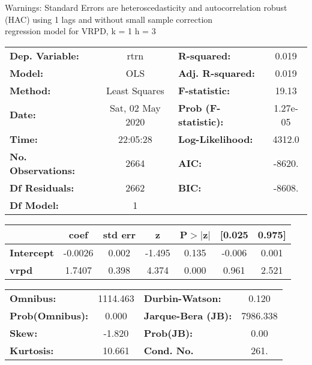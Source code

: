 Warnings: \newline
 [1] Standard Errors are heteroscedasticity and autocorrelation robust (HAC) using 1 lags and without small sample correction\\ 

regression model for VRPD, k = 1 h = 3\begin{center}
\begin{tabular}{lclc}
\toprule
\textbf{Dep. Variable:}    &       rtrn       & \textbf{  R-squared:         } &     0.019   \\
\textbf{Model:}            &       OLS        & \textbf{  Adj. R-squared:    } &     0.019   \\
\textbf{Method:}           &  Least Squares   & \textbf{  F-statistic:       } &     19.13   \\
\textbf{Date:}             & Sat, 02 May 2020 & \textbf{  Prob (F-statistic):} &  1.27e-05   \\
\textbf{Time:}             &     22:05:28     & \textbf{  Log-Likelihood:    } &    4312.0   \\
\textbf{No. Observations:} &        2664      & \textbf{  AIC:               } &    -8620.   \\
\textbf{Df Residuals:}     &        2662      & \textbf{  BIC:               } &    -8608.   \\
\textbf{Df Model:}         &           1      & \textbf{                     } &             \\
\bottomrule
\end{tabular}
\begin{tabular}{lcccccc}
                   & \textbf{coef} & \textbf{std err} & \textbf{z} & \textbf{P$> |$z$|$} & \textbf{[0.025} & \textbf{0.975]}  \\
\midrule
\textbf{Intercept} &      -0.0026  &        0.002     &    -1.495  &         0.135        &       -0.006    &        0.001     \\
\textbf{vrpd}      &       1.7407  &        0.398     &     4.374  &         0.000        &        0.961    &        2.521     \\
\bottomrule
\end{tabular}
\begin{tabular}{lclc}
\textbf{Omnibus:}       & 1114.463 & \textbf{  Durbin-Watson:     } &    0.120  \\
\textbf{Prob(Omnibus):} &   0.000  & \textbf{  Jarque-Bera (JB):  } & 7986.338  \\
\textbf{Skew:}          &  -1.820  & \textbf{  Prob(JB):          } &     0.00  \\
\textbf{Kurtosis:}      &  10.661  & \textbf{  Cond. No.          } &     261.  \\
\bottomrule
\end{tabular}
\end{center}

